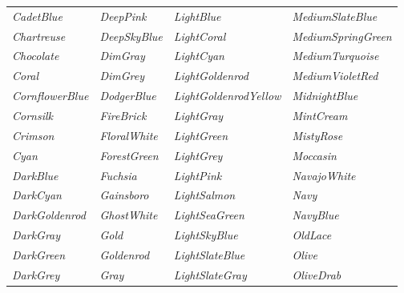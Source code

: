 \documentclass{article}
\newcommand\myfcolorbox[1]{\fcolorbox{black}{#1}{\phantom{\tiny{color}}} \textit{#1}\quad}
\begin{document}
\begin{center}
\begin{tabular}{llll}
			\myfcolorbox{CadetBlue} & \myfcolorbox{DeepPink} & \myfcolorbox{LightBlue} & \myfcolorbox{MediumSlateBlue} \\
			
			\myfcolorbox{Chartreuse} & \myfcolorbox{DeepSkyBlue} & \myfcolorbox{LightCoral} & \myfcolorbox{MediumSpringGreen} \\
			
			\myfcolorbox{Chocolate} & \myfcolorbox{DimGray} & \myfcolorbox{LightCyan} & \myfcolorbox{MediumTurquoise} \\
			
			\myfcolorbox{Coral} & \myfcolorbox{DimGrey} & \myfcolorbox{LightGoldenrod} & \myfcolorbox{MediumVioletRed} \\
			
			\myfcolorbox{CornflowerBlue} & \myfcolorbox{DodgerBlue} & \myfcolorbox{LightGoldenrodYellow} & \myfcolorbox{MidnightBlue} \\
			
			\myfcolorbox{Cornsilk} & \myfcolorbox{FireBrick} & \myfcolorbox{LightGray} & \myfcolorbox{MintCream} \\
			
			\myfcolorbox{Crimson} & \myfcolorbox{FloralWhite} & \myfcolorbox{LightGreen} & \myfcolorbox{MistyRose} \\
			
			\myfcolorbox{Cyan} & \myfcolorbox{ForestGreen} & \myfcolorbox{LightGrey} & \myfcolorbox{Moccasin} \\
			
			\myfcolorbox{DarkBlue} & \myfcolorbox{Fuchsia} & \myfcolorbox{LightPink} & \myfcolorbox{NavajoWhite} \\
			
			\myfcolorbox{DarkCyan} & \myfcolorbox{Gainsboro} & \myfcolorbox{LightSalmon} & \myfcolorbox{Navy} \\
			
			\myfcolorbox{DarkGoldenrod} & \myfcolorbox{GhostWhite} & \myfcolorbox{LightSeaGreen} & \myfcolorbox{NavyBlue} \\
			
			\myfcolorbox{DarkGray} & \myfcolorbox{Gold} & \myfcolorbox{LightSkyBlue} & \myfcolorbox{OldLace} \\
			
			\myfcolorbox{DarkGreen} & \myfcolorbox{Goldenrod} & \myfcolorbox{LightSlateBlue} & \myfcolorbox{Olive} \\
			
			\myfcolorbox{DarkGrey} & \myfcolorbox{Gray} & \myfcolorbox{LightSlateGray} & \myfcolorbox{OliveDrab} \\
			

\end{tabular}
\end{center}
\end{document}

